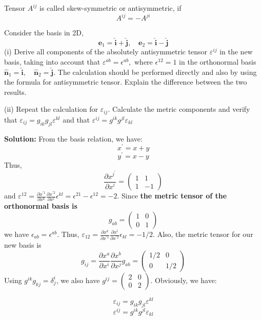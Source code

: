 Tensor $A^{i j}$ is called skew-symmetric or antisymmetric, if
\begin{equation}
A^{i j}=-A^{j i}
\end{equation}
\begin{example}
Consider the basis in 2D,
$$
\mathbf{e}_{1}=\hat{\mathbf{i}}+\hat{\mathbf{j}}, \quad \mathbf{e}_{2}=\hat{\mathbf{i}}-\hat{\mathbf{j}}
$$
(i) Derive all components of the absolutely antisymmetric tensor $\varepsilon^{i j}$ in the new basis, taking into account that $\varepsilon^{a b}=\epsilon^{a b},$ where $\epsilon^{12}=1$ in the orthonormal basis $\hat{\mathbf{n}}_{1}=\hat{\mathbf{i}}, \quad \hat{\mathbf{n}}_{2}=\hat{\mathbf{j}} .$ The calculation should be performed directly and also by using the formula for antisymmetric tensor. Explain the difference between the two results. 

(ii) Repeat the calculation for $\varepsilon_{i j} .$ Calculate the metric components and verify that $\varepsilon_{i j}=g_{i k} g_{j l} \varepsilon^{k l}$ and that $\varepsilon^{i j}=g^{i k} g^{j l} \varepsilon_{k l}$

\end{example}
\textbf{Solution:}
From the basis relation, we have:
$$
x^{\prime}=x+y
$$
$$
y^{\prime}=x-y
$$
Thus, 
$$
\frac{\partial x^{j^{\prime}}}{\partial x^i}=\left(\begin{array}{cc}
{1} & {1}\\
{1} & {-1}
\end{array}\right)
$$
and $\varepsilon^{12}=\frac{\partial x^{\prime 1}}{\partial x^k}\frac{\partial x^{\prime 2}}{\partial x^l}\epsilon^{kl}=\epsilon^{21}-\epsilon^{12}=-2$. Since \textbf{the metric tensor of the orthonormal basis is}
$$
g_{ab}=\left(\begin{array}{cc}
{1} & {0}\\
{0} & {1}
\end{array}\right)
$$
we have $\epsilon_{ab}=\epsilon^{ab}$. Thus, $\varepsilon_{12}=\frac{\partial x^k}{\partial x^{\prime 1}}\frac{\partial x^l}{\partial x^{\prime 2}}\epsilon_{kl}=-1/2$. Also, the metric tensor for our new basis is
$$
g_{ij}=\frac{\partial x^{a}}{\partial x^i}\frac{\partial x^{b}}{\partial x^j}g_{ab}=\left(\begin{array}{cc}
{1/2} & {0}\\
{0} & {1/2}
\end{array}\right)
$$
Using $g^{i k} g_{k j}=\delta_{j}^{i}$, we also have $g^{ij}=\left(\begin{array}{cc}
{2} & {0}\\{0} & {2}\end{array}\right)$. Obviously, we have:
\begin{qt}
$$
\varepsilon_{i j}=g_{i k} g_{j l} \varepsilon^{k l}
$$
$$
\varepsilon^{i j}=g^{i k} g^{j l} \varepsilon_{k l}
$$
\end{qt}

